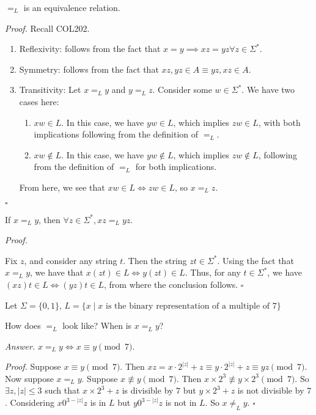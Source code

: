 \documentclass[a4paper]{article}
\newenvironment{proof}{\begin{breakbox}\textit{Proof.}}{\hfill$\square$\end{breakbox}}
\newenvironment{ans}{\begin{breakbox}\textit{Answer.}}{\end{breakbox}}
\newcommand{\nl}{\vspace{0.2cm}\\}
\begin{document}
\begin{claim}
    $=_L$ is an equivalence relation.
\end{claim}
\begin{proof}
    Recall COL202.\nl
    \begin{enumerate}
        \item Reflexivity: follows from the fact that $x = y \implies xz = yz \forall z \in \Sigma^*$.
        \item Symmetry: follows from the fact that $xz, yz \in A \equiv yz, xz \in A$.
        \item Transitivity: Let $x =_L y$ and $y =_L z$. Consider some $w \in \Sigma^*$. We have two cases here:
            \begin{enumerate}
                \item $xw \in L$. In this case, we have $yw \in L$, which implies $zw \in L$, with both implications following from the definition of $=_L$.
                \item $xw \not\in L$. In this case, we have $yw \not\in L$, which implies $zw \not\in L$, following from the definition of $=_L$ for both implications.
            \end{enumerate}
            From here, we see that $xw \in L \iff zw \in L$, so $x =_L z$.
    \end{enumerate}
\end{proof}

\begin{claim}
    If $x =_L y$, then $\forall z \in \Sigma^*, xz =_L yz$.
\end{claim}

\begin{proof}

    Fix $z$, and consider any string $t$. Then the string $zt \in \Sigma^*$. Using the fact that $x =_L y$, we have that $x(zt) \in L \iff y(zt) \in L$. Thus, for any $t \in \Sigma^*$, we have
        $(xz)t \in L \iff (yz)t \in L$, from where the conclusion follows.
\end{proof}

\begin{eg}
    Let $\Sigma = \{0, 1\}$, $L = \{x \mid x \text{ is the binary representation of a multiple of } 7\}$
\end{eg}

\begin{ques}
    How does $=_L$ look like? When is $x =_L y$?
\end{ques}

\begin{ans}
    $x =_L y \iff x \equiv y \pmod 7$.
        \begin{proof}
            Suppose $x \equiv y \pmod 7$. Then $xz = x \cdot 2^{|z|} + z \equiv y \cdot 2^{|z|} + z \equiv yz \pmod 7$.
            Now suppose $x =_L y$. Suppose $x \not\equiv y \pmod 7$. Then $x \times 2^3 \not\equiv y \times 2^3 \pmod 7$. So $\exists z, |z| \le 3$ such that $x \times 2^3 + z$ is
            divisible by $7$ but $y \times 2^3 + z$ is not
            divisible by $7$. Considering $x 0^{3-|z|}z$ is in $L$ but $y 0^{3-|z|}z$ is not in $L$. So $x \not=_L y$.
        \end{proof}
\end{ans}
\end{document}

